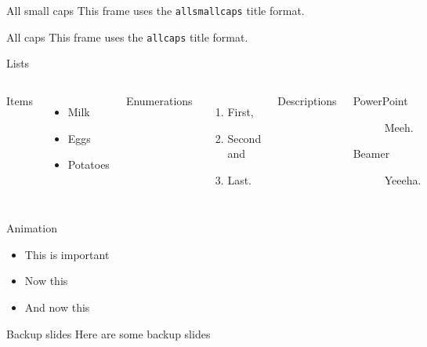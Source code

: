 {
  \begin{frame}{All small caps}
    This frame uses the \texttt{allsmallcaps} title format.
  \end{frame}
}

{
  \begin{frame}{All caps}
    This frame uses the \texttt{allcaps} title format.
  \end{frame}
}

\begin{frame}{Lists}
  \begin{columns}[T,onlytextwidth]
    Items
    \begin{itemize}
      \item Milk \item Eggs \item Potatoes
    \end{itemize}

    Enumerations
    \begin{enumerate}
      \item First, \item Second and \item Last.
    \end{enumerate}

    Descriptions
    \begin{description}
      \item[PowerPoint] Meeh. \item[Beamer] Yeeeha.
    \end{description}
  \end{columns}
\end{frame}

\begin{frame}{Animation}
  \begin{itemize}[<+- | alert@+>]
    \item \alert<4>{This is important}
    \item Now this
    \item And now this
  \end{itemize}
\end{frame}

\appendix

\begin{frame}{Backup slides}
  Here are some backup slides
\end{frame}




